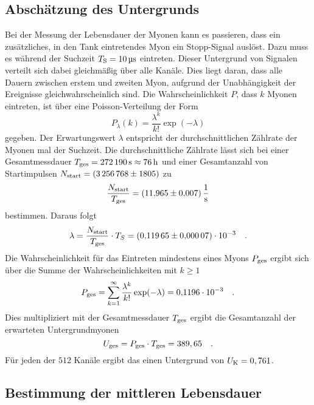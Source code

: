 \subsection{Abschätzung des Untergrunds}

\noindent
Bei der Messung der Lebensdauer der Myonen kann es passieren, dass ein zusätzliches, in den Tank eintretendes Myon ein Stopp-Signal auslöst.
Dazu muss es während der Suchzeit $T_\t{S} = \SI{10}{\micro\second}$ eintreten. 
Dieser Untergrund von Signalen verteilt sich dabei gleichmäßig über alle Kanäle.
Dies liegt daran, dass alle Dauern zwischen erstem und zweiten Myon, aufgrund der Unabhängigkeit der Ereignisse gleichwahrscheinlich sind. 
Die Wahrscheinlichkeit $P$, dass $k$ Myonen eintreten, ist über eine Poisson-Verteilung der Form 
\begin{equation*}
  P_{\lambda}(k)=  \frac{\lambda^k}{k!} \exp({-\lambda})
\end{equation*}
gegeben. Der Erwartungswert $\lambda$ entspricht der durchschnittlichen Zählrate der Myonen mal der Suchzeit.
Die durchschnittliche Zählrate lässt sich bei einer Gesamtmessdauer $T_\t{ges} = \SI{272190}{\second} \approx \SI{76}{\hour}$ 
und einer Gesamtanzahl von Startimpulsen $N_\t{start} = \SI{3256768(1805)}{}$ zu
\begin{equation*}
\frac{N_\t{start}}{T_\t{ges}} = \SI{11.965(0007)}{\per\second}
\end{equation*}
bestimmen. Daraus folgt 
\begin{equation*}
  \lambda = \frac{N_\t{start}}{T_\t{ges}} \cdot T_S = \SI{0.11965 (000007)e-3}{} \quad.
\end{equation*}
Die Wahrscheinlichkeit für das Eintreten mindestens eines Myons $P_\t{ges}$ ergibt sich über die Summe der Wahrscheinlichkeiten mit $k \geq 1$
\begin{equation*}
  P_\t{ges}= \sum_{k=1}^\infty \frac{\lambda^k}{k!} \exp({-\lambda}) = \SI{0.1196 e-3}{} \quad .
\end{equation*}
Dies multipliziert mit der Gesamtmessdauer $T_\t{ges}$ ergibt die Gesamtanzahl der erwarteten Untergrundmyonen
\begin{equation*}
  U_\t{ges} = P_\t{ges} \cdot T_\t{ges} = 389,65 \quad .
\end{equation*}
Für jeden der $512$ Kanäle ergibt das einen Untergrund von $U_\t{K} = 0,761$.


\subsection{Bestimmung der mittleren Lebensdauer}

